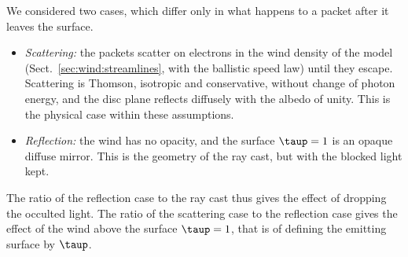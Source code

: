 

We considered two cases, which differ only in what happens to a packet after it leaves the surface.
\begin{itemize}
\item \emph{Scattering:} the packets scatter on electrons in the wind density of the model (Sect.~\ref{sec:wind:streamlines}, with the ballistic speed law) until they escape.
Scattering is Thomson, isotropic and conservative, without change of photon energy, and the disc plane reflects diffusely with the albedo of unity.
This is the physical case within these assumptions.
\item \emph{Reflection:} the wind has no opacity, and the surface $\taup = 1$ is an opaque diffuse mirror.
This is the geometry of the ray cast, but with the blocked light kept.
\end{itemize}
The ratio of the reflection case to the ray cast thus gives the effect of dropping the occulted light.
The ratio of the scattering case to the reflection case gives the effect of the wind above the surface $\taup = 1$, that is of defining the emitting surface by $\taup$.


